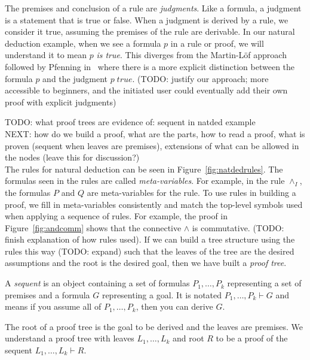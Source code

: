 \documentclass[conference]{IEEEtran}
\begin{document}
The premises and conclusion of a rule are \textit{judgments}. Like a formula, a judgment is a statement that is true or false. When a judgment is derived by a rule, we consider it true, assuming the premises of the rule are derivable. In our natural deduction example, when we see a formula $p$ in a rule or proof, we will understand it to mean $p$ \textit{is true}. This diverges from the Martin-L{\"o}f approach followed by Pfenning in~\cite{natded-pfenning} where there is a more explicit distinction between the formula $p$ and the judgment $p \; \mathit{true}$. (TODO: justify our approach; more accessible to beginners, and the initiated user could eventually add their own proof with explicit judgments)

TODO: what proof trees are evidence of: sequent in natded example \\

NEXT: how do we build a proof, what are the parts, how to read a proof, what is proven (sequent when leaves are premises), extensions of what can be allowed in the nodes (leave this for discussion?) \\

The rules for natural deduction can be seen in Figure~\ref{fig:natdedrules}. The formulas seen in the rules are called \textit{meta-variables}. For example, in the rule $\wedge_I$, the formulas $P$ and $Q$ are meta-variables for the rule. To use rules in building a proof, we fill in meta-variables consistently and match the top-level symbols used when applying a sequence of rules. For example, the proof in Figure~\ref{fig:andcomm} shows that the connective $\wedge$ is commutative. (TODO: finish explanation of how rules used). If we can build a tree structure using the rules this way (TODO: expand) such that the leaves of the tree are the desired assumptions and the root is the desired goal, then we have built a \textit{proof tree}.

A \textit{sequent} is an object containing a set of formulas $P_1, \dots, P_k$ representing a set of premises and a formula $G$ representing a goal. It is notated $P_1, \dots, P_k \vdash G$ and means if you assume all of $P_1, \dots, P_k$, then you can derive $G$.

The root of a proof tree is the goal to be derived and the leaves are premises. We understand a proof tree with leaves $L_1, \dots, L_k$ and root $R$ to be a proof of the sequent $L_1, \dots, L_k \vdash R$.
\end{document}
